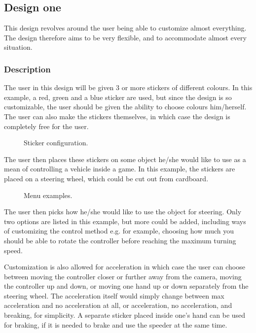 \subsection{Design one}
This design revolves around the user being able to customize almost everything. The design therefore aims to be very flexible, and to accommodate almost every situation.

\subsubsection*{Description}
The user in this design will be given 3 or more stickers of different colours. In this example, a red, green and a blue sticker are used, but since the design is so customizable, the user should be given the ability to choose colours him/herself. The user can also make the stickers themselves, in which case the design is completely free for the user.


\begin{figure}[h]
\centering
{}
\caption{Sticker configuration.}
\end{figure}

The user then places these stickers on some object he/she would like to use as a mean of controlling a vehicle inside a game. In this example, the stickers are placed on a steering wheel, which could be cut out from cardboard.

\begin{figure}[h]
\centering
{}
\caption{Menu examples.}
\end{figure}

The user then picks how he/she would like to use the object for steering. Only two options are listed in this example, but more could be added, including ways of customizing the control method e.g. for example, choosing how much you should be able to rotate the controller before reaching the maximum turning speed.

\bigskip

Customization is also allowed for acceleration in which case the user can choose between moving the controller closer or further away from the camera, moving the controller up and down, or moving one hand up or down separately from the steering wheel. 
The acceleration itself would simply change between max acceleration and no acceleration at all, or acceleration, no acceleration, and breaking, for simplicity. A separate sticker placed inside one’s hand can be used for braking, if it is needed to brake and use the speeder at the same time.

